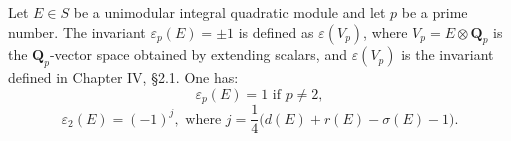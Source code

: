 Let $E \in S$ be a unimodular integral quadratic module and let $p$ be a prime number. The invariant $\varepsilon_p(E) = \pm 1$ is defined as $\varepsilon(V_p)$, where $V_p = E \otimes \mathbf{Q}_p$ is the $\mathbf{Q}_p$-vector space obtained by extending scalars, and $\varepsilon(V_p)$ is the invariant defined in Chapter IV, §2.1. One has:
$$
\varepsilon_p(E) = 1 \text{ if } p \neq 2,
$$
$$
\varepsilon_2(E) = (-1)^j, \text{ where } j = \frac{1}{4}\bigl(d(E) + r(E) - \sigma(E) - 1\bigr).
$$
